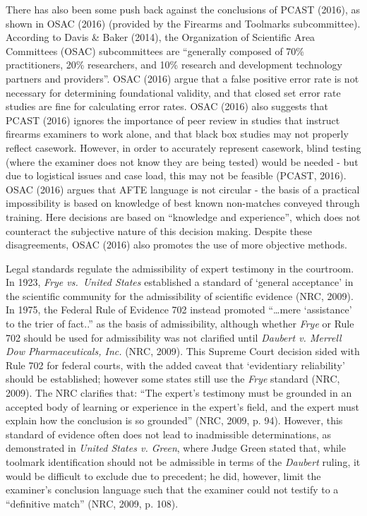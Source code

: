 \documentclass[print]{nuthesis}
\begin{document}
There has also been some push back against the conclusions of PCAST (2016), as shown in OSAC (2016) (provided by the Firearms and Toolmarks subcommittee).
According to Davis \& Baker (2014), the Organization of Scientific Area Committees (OSAC) subcommittees are ``generally composed of 70\% practitioners, 20\% researchers, and 10\% research and development technology partners and providers''.
OSAC (2016) argue that a false positive error rate is not necessary for determining foundational validity, and that closed set error rate studies are fine for calculating error rates.
OSAC (2016) also suggests that PCAST (2016) ignores the importance of peer review in studies that instruct firearms examiners to work alone, and that black box studies may not properly reflect casework.
However, in order to accurately represent casework, blind testing (where the examiner does not know they are being tested) would be needed - but due to logistical issues and case load, this may not be feasible (PCAST, 2016).
OSAC (2016) argues that AFTE language is not circular - the basis of a practical impossibility is based on knowledge of best known non-matches conveyed through training.
Here decisions are based on ``knowledge and experience'', which does not counteract the subjective nature of this decision making.
Despite these disagreements, OSAC (2016) also promotes the use of more objective methods.

Legal standards regulate the admissibility of expert testimony in the courtroom.
In 1923, \emph{Frye vs.~United States} established a standard of `general acceptance' in the scientific community for the admissibility of scientific evidence (NRC, 2009).
In 1975, the Federal Rule of Evidence 702 instead promoted ``\ldots mere `assistance' to the trier of fact..'' as the basis of admissibility, although whether \emph{Frye} or Rule 702 should be used for admissibility was not clarified until \emph{Daubert v. Merrell Dow Pharmaceuticals, Inc.} (NRC, 2009).
This Supreme Court decision sided with Rule 702 for federal courts, with the added caveat that `evidentiary reliability' should be established; however some states still use the \emph{Frye} standard (NRC, 2009).
The NRC clarifies that: ``The expert's testimony must be grounded in an accepted body of learning or experience in the expert's field, and the expert must explain how the conclusion is so grounded'' (NRC, 2009, p. 94).
However, this standard of evidence often does not lead to inadmissible determinations, as demonstrated in \emph{United States v. Green}, where Judge Green stated that, while toolmark identification should not be admissible in terms of the \emph{Daubert} ruling, it would be difficult to exclude due to precedent; he did, however, limit the examiner's conclusion language such that the examiner could not testify to a ``definitive match'' (NRC, 2009, p. 108).
\end{document}
